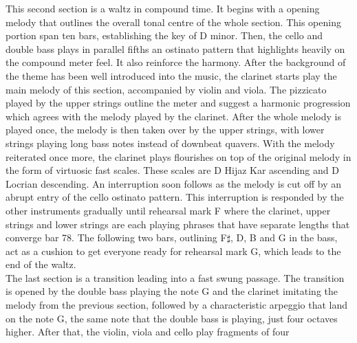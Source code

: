 \documentclass{article}
\begin{document}
This second section is a waltz in compound time. It begins with a opening
melody that outlines the overall tonal centre of the whole section. This
opening portion span ten bars, establishing the key of D minor. Then, the cello
and double bass plays in parallel fifths an ostinato pattern that highlights
heavily on the compound meter feel. It also reinforce the harmony. After the
background of the theme has been well introduced into the music, the clarinet
starts play the main melody of this section, accompanied by violin and viola.
The pizzicato played by the upper strings outline the meter and suggest a
harmonic progression which agrees with the melody played by the clarinet. After
the whole melody is played once, the melody is then taken over by the upper
strings, with lower strings playing long bass notes instead of downbeat
quavers. With the melody reiterated once more, the clarinet plays flourishes on
top of the original melody in the form of virtuosic fast scales. These scales
are D Hijaz Kar ascending and D Locrian descending. An interruption soon
follows as the melody is cut off by an abrupt entry of the cello ostinato
pattern. This interruption is responded by the other instruments gradually
until rehearsal mark F where the clarinet, upper strings and lower strings are
each playing phrases that have separate lengths that converge bar 78. The
following two bars, outlining F\(\sharp\), D, B and G in the bass, act as a
cushion to get everyone ready for rehearsal mark G, which leads to the end of
the waltz.\\

The last section is a transition leading into a fast swung passage. The transition
is opened by the double bass playing the note G and the clarinet imitating the
melody from the previous section, followed by a characteristic arpeggio that land
on the note G, the same note that the double bass is playing, just four octaves
higher. After that, the violin, viola and cello play fragments of four
\end{document}

